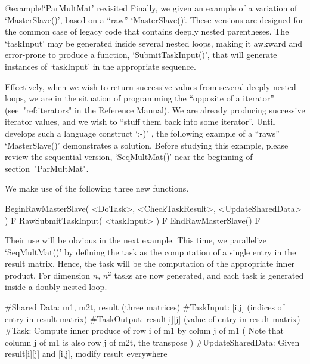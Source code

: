
%
{@example!\noexpand`ParMultMat' revisited}
Finally, we given an example of a variation of `MasterSlave()', based
on a ``raw'' `MasterSlave()'.  These versions are designed for the
common case of legacy code that contains deeply nested parentheses.
The `taskInput' may be generated inside several nested loops, making
it awkward and error-prone to produce a function, `SubmitTaskInput()',
that will generate instances of `taskInput' in the appropriate
sequence.

Effectively, when we wish to return successive values from several deeply
nested loops, we are in the situation of programming the ``opposite of a
{\GAP} iterator'' (see~"ref:iterators" in the Reference Manual).  
We are already producing successive iterator values, and we wish to 
``stuff them back into some iterator''.  Until {\GAP} develops such a
language construct `:-)' , the following example of a ``raws'' 
`MasterSlave()' demonstrates a solution.
Before studying this example, please review the sequential version,
`SeqMultMat()' near the beginning of section~"ParMultMat".

We make use of the following three new {\ParGAP} functions.

\>BeginRawMasterSlave( <DoTask>, <CheckTaskResult>, <UpdateSharedData> ) F
\>RawSubmitTaskInput( <taskInput> ) F
\>EndRawMasterSlave() F

Their use will be obvious in the next example.  This time, we
parallelize `SeqMultMat()' by defining the task as the computation of a
single entry in the result matrix.  Hence, the task will be the
computation of the appropriate inner product.  For dimension $n$,
$n^2$ tasks are now generated, and each task is generated inside a
doubly nested loop.

\beginexample
#Shared Data: m1, m2t, result (three matrices)
#TaskInput:   [i,j] (indices of entry in result matrix)
#TaskOutput:  result[i][j] (value of entry in result matrix)
#Task:        Compute inner produce of row i of m1 by colum j of m1
              ( Note that column j of m1 is also row j of m2t, the transpose )
#UpdateSharedData:  Given result[i][j] and [i,j], modify result everywhere


